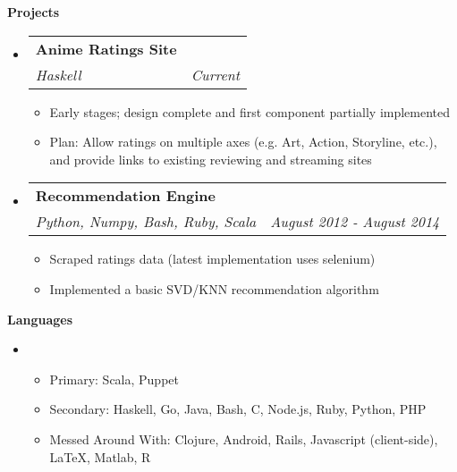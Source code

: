 \documentclass[letterpaper,11pt]{article}
\makeatletter
\newcommand{\resitem}[1]{\item #1 \vspace{-2pt}}
\newcommand{\resheading}[1]{{\large {\textbf{#1 \vphantom{p\^{E}}}}}}
\newcommand{\ressubheading}[4]{
  \begin{tabular*}{6.5in}{l@{\extracolsep{\fill}}r}
    \textbf{#1} & #2 \\
    \textit{#3} & \textit{#4} \\
  \end{tabular*}\vspace{-6pt}}
\makeatother
\begin{document}
\resheading{Projects}
\begin{itemize}
\item[]
  \ressubheading{Anime Ratings Site}{}{Haskell}{Current}
  \begin{itemize}
    \resitem{Early stages; design complete and first component partially implemented}
    \resitem{Plan: Allow ratings on multiple axes (e.g. Art, Action, Storyline, etc.), and provide links to existing reviewing and streaming sites}
  \end{itemize}
\item[]
  \ressubheading{Recommendation Engine}{}{Python, Numpy, Bash, Ruby, Scala}{August 2012 - August 2014}
  \begin{itemize}
    \resitem{Scraped ratings data (latest implementation uses selenium)}
    \resitem{Implemented a basic SVD/KNN recommendation algorithm}
  \end{itemize}
  
\end{itemize}

\resheading{Languages}
\begin{itemize}
\item[]
  \begin{itemize}
    \resitem{Primary: Scala, Puppet}
    \resitem{Secondary: Haskell, Go, Java, Bash, C, Node.js, Ruby, Python, PHP}
    \resitem{Messed Around With: Clojure, Android, Rails, Javascript (client-side), \LaTeX, Matlab, R}
  \end{itemize}
\end{itemize}
\end{document}
